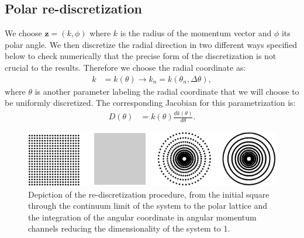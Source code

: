 \documentclass[english,aps,prd,nofootinbib,twocolumn]{revtex4-1}
\begin{document}
\subsection{Polar re-discretization}

We choose $\mathbf{z}=(k,\phi)$ where $k$ is the radius of the momentum vector and $\phi$ its polar angle. We then discretize the radial direction in two different ways specified below to check numerically that the precise form of the discretization is not crucial to the results. Therefore we choose the radial coordinate as:
\begin{equation}
\label{eq:Supp:Tangential-radius}
\begin{split}
    k &= k(\theta) \rightarrow k_{n} = k(\theta_{n},\Delta \theta), 
\end{split}
\end{equation}
where $\theta$ is another parameter labeling the radial coordinate that we will choose to be uniformly discretized. The corresponding Jacobian for this parametrization is:
\begin{equation}
\label{eq:Supp:Jacobian}
\begin{split}
    D(\theta) &= k(\theta)\frac{dk(\theta)}{d\theta}.
\end{split}
\end{equation}

\begin{figure}[b]
\centering
\includegraphics[scale=0.8]{SquarePolarLattice.pdf}
\caption{Depiction of the re-discretization procedure, from the initial square through the continuum limit of the system to the polar lattice and the integration of the angular coordinate in angular momentum channels reducing the dimensionality of the system to 1.}
\end{figure}
\end{document}
